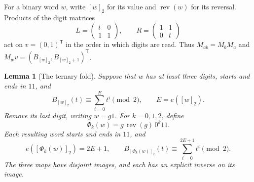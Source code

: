 \documentclass[11pt,a4paper]{article}
\newtheorem{lemma}[theorem]{Lemma}
\theoremstyle{definition}
\theoremstyle{remark}
\begin{document}
For a binary word $w$, write $[w]_2$ for its value and
$\operatorname{rev}(w)$ for its reversal. Products of the digit matrices
\[
 L=\begin{pmatrix}t&0\\1&1\end{pmatrix},\qquad
 R=\begin{pmatrix}1&1\\0&t\end{pmatrix}
\]
act on $v=(0,1)^{\mathsf T}$ in the order in which digits are read.
Thus $M_{ab}=M_bM_a$ and
$M_wv=(B_{[w]_2},B_{[w]_2+1})^{\mathsf T}$.

\begin{lemma}[The ternary fold]
Suppose that $w$ has at least three digits, starts and ends in $11$, and
\[
 B_{[w]_2}(t)\equiv\sum_{i=0}^{E}t^i\pmod2,
 \qquad E=e([w]_2).
\]
Remove its last digit, writing $w=g1$. For $k=0,1,2$, define
\[
 \Phi_k(w)=g\,\operatorname{rev}(g)\,0^k11.
\]
Each resulting word starts and ends in $11$, and
\[
 e([\Phi_k(w)]_2)=2E+1,\qquad
 B_{[\Phi_k(w)]_2}(t)\equiv\sum_{i=0}^{2E+1}t^i\pmod2.
\]
The three maps have disjoint images, and each has an explicit inverse
on its image.
\end{lemma}
\end{document}
